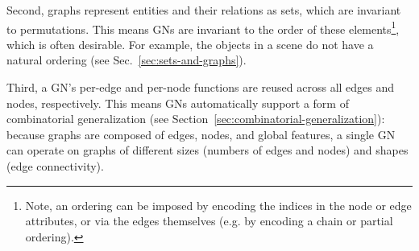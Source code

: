 \documentclass[10pt]{book}
\begin{document}
Second, graphs represent entities and their relations as sets, which are invariant to permutations. This means GNs are invariant to the order of these elements\footnote{Note, an ordering can be imposed by encoding the indices in the node or edge attributes, or via the edges themselves (e.g. by encoding a chain or partial ordering).}, which is often desirable.
For example, the objects in a scene do not have a natural ordering (see Sec.~\ref{sec:sets-and-graphs}).

Third, a GN's per-edge and per-node functions are reused across all edges and nodes, respectively. This means GNs automatically support a form of combinatorial generalization (see Section~\ref{sec:combinatorial-generalization}): because graphs are composed of edges, nodes, and global features, a single GN can operate on graphs of different sizes (numbers of edges and nodes) and shapes (edge connectivity).













\printindex

\nocite{*}

\end{document}
